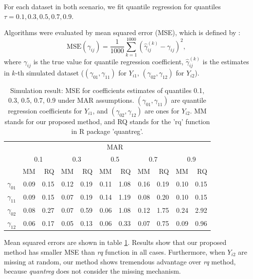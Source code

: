 \documentclass[12pt]{article}
\begin{document}
For each dataset in both scenario, we fit quantile regression for
quantiles $\tau = 0.1, 0.3, 0.5, 0.7, 0.9$.

Algorithms were evaluated by mean squared error (MSE), which is
defined by :
\begin{equation*}
  \text{MSE} (\gamma_{ij}) = \frac{1}{1000} \sum_{k = 1}^{1000} \left( \hat{\gamma}_{ij}^{(k)}  - \gamma_{ij}\right)^2,
\end{equation*}
where $\gamma_{ij}$ is the true value for quantile regression
coefficient, $\hat{\gamma}_{ij}^{(k)}$ is the estimates in $k$-th
simulated dataset ($(\gamma_{01}, \gamma_{11})$ for $Y_{i1}$,
$(\gamma_{02}, \gamma_{12})$ for $Y_{i2}$).

\begin{table}[ht]
  \renewcommand{\arraystretch}{1.3}
  \centering
  \caption{Simulation result: MSE for coefficients estimates of quantiles
    0.1, 0.3, 0.5, 0.7, 0.9 under MAR assumptions. $(\gamma_{01}, \gamma_{11})$ 
    are quantile regression coefficients for $Y_{i1}$, and $(\gamma_{02}, \gamma_{12})$ 
    are ones for $Y_{i2}$. MM stands for our proposed method, and RQ stands for the 'rq'     function in R package 'quantreg'.}\label{tab:simh2} 
  \vspace{10pt}
  \begin{tabular}{rrrrrrrrrrr}
    \toprule
    & \multicolumn{ 10}{c}{MAR} \\
    \cline{2-11}
    &  \multicolumn{2}{c}{0.1} &  \multicolumn{2}{c}{0.3} &  \multicolumn{2}{c}{0.5} &  \multicolumn{2}{c}{0.7} &  \multicolumn{2}{c}{0.9} \\
    \cline{2-11}
    & MM & RQ    & MM & RQ    & MM & RQ    & MM & RQ    & MM & RQ \\
    \hline
    $\gamma_{01}$ & 0.09 & 0.15 & 0.12 & 0.19 & 0.11 & 1.08 & 0.16 & 0.19 & 0.10 & 0.15 \\ 
    $\gamma_{11}$ & 0.09 & 0.15 & 0.07 & 0.19 & 0.14 & 1.19 & 0.08 & 0.20 & 0.10 & 0.15 \\ 
    $\gamma_{02}$ & 0.08 & 0.27 & 0.07 & 0.59 & 0.06 & 1.08 & 0.12 & 1.75 & 0.24 & 2.92 \\ 
    $\gamma_{12}$ & 0.06 & 0.17 & 0.05 & 0.13 & 0.06 & 0.33 & 0.07 & 0.75 & 0.09 & 0.96 \\ 
    \bottomrule
  \end{tabular}
\end{table}

Mean squared errors are shown in table \ref{tab:simh2}. Results show
that our proposed method has smaller MSE than \textit{rq} function in
all cases. Furthermore, when $Y_{i2}$ are missing at random, our
method shows tremendous advantage over \textit{rq} method, because
\textit{quantreg} does not consider the missing mechanism.
\end{document}
